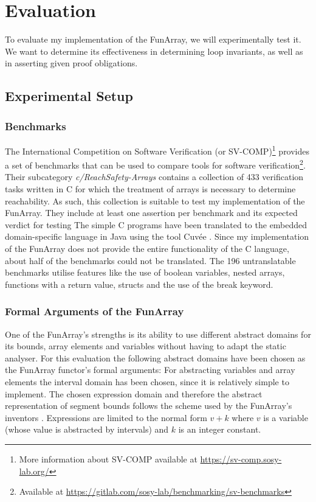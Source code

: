 \chapter{Evaluation}\label{chap:evaluation}

To evaluate my implementation of the FunArray, we will experimentally test it. We want to determine its effectiveness in determining loop invariants, as well as in asserting given proof obligations.

\section{Experimental Setup}
\subsection{Benchmarks}

The International Competition on Software Verification (or SV-COMP)\footnote{More information about SV-COMP available at \url{https://sv-comp.sosy-lab.org/}} provides a set of benchmarks that can be used to compare tools for software verification\footnote{Available at \url{https://gitlab.com/sosy-lab/benchmarking/sv-benchmarks}}. Their subcategory \textit{c/ReachSafety-Arrays} contains a collection of 433 verification tasks written in C for which the treatment of arrays is necessary to determine reachability. As such, this collection is suitable to test my implementation of the FunArray. They include at least one assertion per benchmark and its expected verdict for testing 
The simple C programs have been translated to the embedded domain-specific language in Java using the tool Cuv\'ee \cite{ernst2020}. Since my implementation of the FunArray does not provide the entire functionality of the C language, about half of the benchmarks could not be translated. The 196 untranslatable benchmarks utilise features like the use of boolean variables, nested arrays, functions with a return value, structs and the use of the break keyword.

\subsection{Formal Arguments of the FunArray}

One of the FunArray's strengths is its ability to use different abstract domains for its bounds, array elements and variables without having to adapt the static analyser. For this evaluation the following abstract domains have been chosen as the FunArray functor's formal arguments: For abstracting variables and array elements the interval domain has been chosen, since it is relatively simple to implement. The chosen expression domain and therefore the abstract representation of segment bounds follows the scheme used by the FunArray's inventors \cite[section 7.2]{cousot2011}. Expressions are limited to the normal form $v+k$ where $v$ is a variable (whose value is abstracted by intervals) and $k$ is an integer constant.

